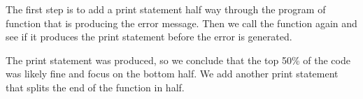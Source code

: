 \documentclass[
]{book}
\newenvironment{Shaded}{\begin{snugshade}}{\end{snugshade}}
\newcommand{\CommentTok}[1]{\textcolor[rgb]{0.56,0.35,0.01}{\textit{#1}}}
\newcommand{\ControlFlowTok}[1]{\textcolor[rgb]{0.13,0.29,0.53}{\textbf{#1}}}
\newcommand{\DecValTok}[1]{\textcolor[rgb]{0.00,0.00,0.81}{#1}}
\newcommand{\KeywordTok}[1]{\textcolor[rgb]{0.13,0.29,0.53}{\textbf{#1}}}
\newcommand{\NormalTok}[1]{#1}
\newcommand{\StringTok}[1]{\textcolor[rgb]{0.31,0.60,0.02}{#1}}
\begin{document}
The first step is to add a print statement half way through the program of function that is producing the error message. Then we call the function again and see if it produces the print statement before the error is generated.

\begin{Shaded}
\end{Shaded}

The print statement was produced, so we conclude that the top 50\% of the code was likely fine and focus on the bottom half. We add another print statement that splits the end of the function in half.
\end{document}
